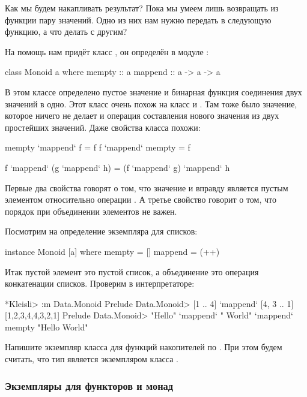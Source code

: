 Как мы будем накапливать результат? Пока мы умеем лишь 
возвращать из функции пару значений. Одно из них нам 
нужно передать в следующую функцию, а что делать с другим? 

На помощь нам придёт класс 
, он определён в
модуле :

\begin{code}
class Monoid a where
    mempty  :: a
    mappend :: a -> a -> a
\end{code}

В этом классе определено пустое значение 
и бинарная функция соединения двух значений в одно.
Этот класс очень похож на класс  и 
. Там тоже было значение, которое ничего не делает
и операция составления нового значения из двух простейших значений.
Даже свойства класса похожи:

\begin{code}
mempty  `mappend` f         = f
f       `mappend` mempty    = f

f `mappend` (g `mappend` h) =  (f `mappend` g) `mappend` h 
\end{code}


Первые два свойства говорят о том, что значение
 и вправду является пустым элементом относительно
операции . А третье свойство говорит о том, что
порядок при объединении элементов не важен.

Посмотрим на определение экземпляра для списков:

\begin{code}
instance Monoid [a] where
    mempty  = []
    mappend = (++)
\end{code}

Итак пустой элемент это пустой список, а объединение 
это операция конкатенации списков. Проверим в интерпретаторе:

\begin{code}
*Kleisli> :m Data.Monoid
Prelude Data.Monoid> [1 .. 4] `mappend` [4, 3 .. 1]
[1,2,3,4,4,3,2,1]
Prelude Data.Monoid> "Hello" `mappend` " World" `mappend` mempty
"Hello World"
\end{code}

Напишите экземпляр класса  для функций 
накопителей по . При этом будем считать, что тип  
является экземпляром класса .

\subsubsection{Экземпляры для функторов и монад}

